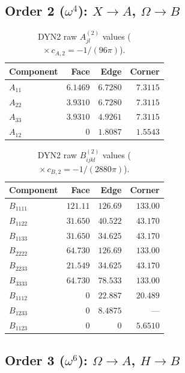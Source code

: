 \documentclass[11pt,a4paper]{article}
\theoremstyle{plain}
\theoremstyle{remark}
\begin{document}
\subsection{Order 2 ($\omega^4$): $X \to A$, $\Omega \to B$}

\begin{table}[ht]
\centering
\caption{DYN2 raw $A^{(2)}_{jl}$ values ($\times\, c_{A,2} = -1/(96\pi)$).}
\label{tab:dyn2-A}
\begin{tabular}{l*{3}{r}}
\toprule
Component & Face & Edge & Corner \\
\midrule
$A_{11}$ & $6.1469$ & $6.7280$ & $7.3115$ \\
$A_{22}$ & $3.9310$ & $6.7280$ & $7.3115$ \\
$A_{33}$ & $3.9310$ & $4.9261$ & $7.3115$ \\
$A_{12}$ & $0$ & $1.8087$ & $1.5543$ \\
\bottomrule
\end{tabular}
\end{table}

\begin{table}[ht]
\centering
\caption{DYN2 raw $B^{(2)}_{ijkl}$ values ($\times\, c_{B,2} = -1/(2880\pi)$).}
\label{tab:dyn2-B}
\begin{tabular}{l*{3}{r}}
\toprule
Component & Face & Edge & Corner \\
\midrule
$B_{1111}$ & $121.11$ & $126.69$ & $133.00$ \\
$B_{1122}$ & $31.650$ & $40.522$ & $43.170$ \\
$B_{1133}$ & $31.650$ & $34.625$ & $43.170$ \\
$B_{2222}$ & $64.730$ & $126.69$ & $133.00$ \\
$B_{2233}$ & $21.549$ & $34.625$ & $43.170$ \\
$B_{3333}$ & $64.730$ & $78.533$ & $133.00$ \\
$B_{1112}$ & $0$ & $22.887$ & $20.489$ \\
$B_{1233}$ & $0$ & $8.4875$ & --- \\
$B_{1123}$ & $0$ & $0$ & $5.6510$ \\
\bottomrule
\end{tabular}
\end{table}

\subsection{Order 3 ($\omega^6$): $\Omega \to A$, $H \to B$}
\end{document}
